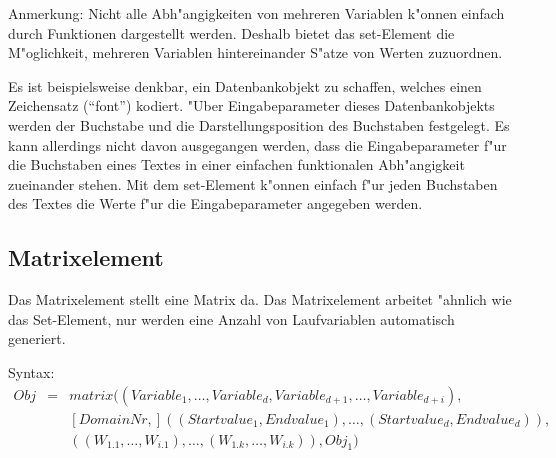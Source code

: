 \bigskip\noindent
Anmerkung:
Nicht alle Abh"angigkeiten von mehreren Variablen k"onnen einfach durch Funktionen dargestellt werden. Deshalb bietet das set-Element die M"oglichkeit, mehreren Variablen hintereinander S"atze von Werten zuzuordnen.

Es ist beispielsweise denkbar, ein Datenbankobjekt zu schaffen, welches einen Zeichensatz (``font'') kodiert. "Uber Eingabeparameter dieses Datenbankobjekts werden der Buchstabe und die Darstellungsposition des Buchstaben festgelegt. Es kann allerdings nicht davon ausgegangen werden, dass die Eingabeparameter f"ur die Buchstaben eines Textes in einer einfachen funktionalen Abh"angigkeit zueinander stehen. Mit dem set-Element k"onnen einfach f"ur jeden Buchstaben des Textes die Werte f"ur die Eingabeparameter angegeben werden.



\subsection{Matrixelement}
\label{secFibMatrixElement}

\bigskip\noindent
Das Matrixelement stellt eine Matrix da. Das Matrixelement arbeitet "ahnlich wie das Set-Element, nur werden eine Anzahl von Laufvariablen automatisch generiert.

\bigskip\noindent
Syntax:
\begin{eqnarray*}
Obj &=& matrix( (Variable_1, \ldots, Variable_d, Variable_{d+1}, \ldots, Variable_{d+i}),\\
&& [DomainNr,] ( (Startvalue_1, Endvalue_1), \ldots, (Startvalue_d, Endvalue_d) ),\\
&& ( (W_{1.1}, \ldots, W_{i.1}), \ldots, (W_{1.k}, \ldots, W_{i.k}) ), Obj_1)
\end{eqnarray*}

